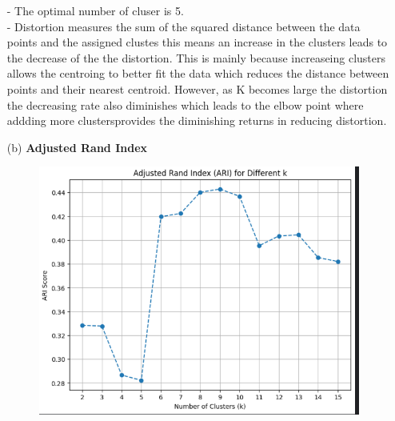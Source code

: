 \documentclass{article}
\begin{document}
\begin{enumerate}
\begin{figure}[H]
\begin{minipage}{0.45\textwidth}
            \label{fig:elbow_graph}
        \end{minipage}
    \end{figure}
    - The optimal number of cluser is 5.\\
    - Distortion measures the sum of the squared distance between the  data points and the assigned clustes this means an increase in the clusters leads to the 
    decrease of the the distortion. This is mainly because increaseing clusters allows the centroing to better fit the data which reduces the distance between points 
    and their nearest centroid. However, as K becomes large the distortion the decreasing rate also diminishes  which leads to the elbow point where addding more clustersprovides the diminishing returns in reducing distortion.

    \item [(b)] \textbf{Adjusted Rand Index}
    \begin{figure}[H]
        \centering
        \begin{minipage}{0.5\textwidth}
            \centering
            \includegraphics[width=\textwidth]{Ari_plot.png}
            \label{fig:ari_plot}
        \end{minipage}
        \hfill
        \begin{minipage}{0.45\textwidth}
            \centering

\end{minipage}
\end{figure}
\end{enumerate}
\end{document}
